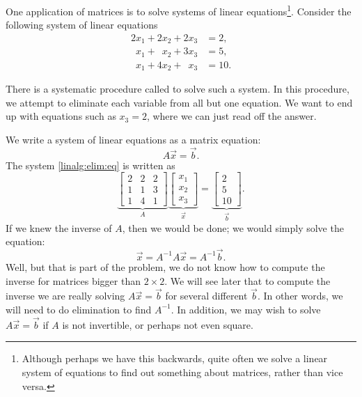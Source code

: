 One application of matrices is to solve systems of
linear equations\footnote{Although perhaps we have this backwards,
quite often we solve a linear system of equations
to find out something about matrices, rather than vice versa.}.
Consider the following system of linear equations
\begin{equation} \label{linalg:elim:eq}
\begin{aligned}
          2 x_1 +           2 x_2 +           2 x_3 & = 2 , \\
\phantom{9} x_1 + \phantom{9} x_2 +           3 x_3 & = 5 , \\
\phantom{9} x_1 +           4 x_2 + \phantom{9} x_3 & = 10 .
\end{aligned}
\end{equation}

There is a systematic procedure
called \emph{} to solve such a system.
In this procedure,
we attempt to eliminate each variable from all but one equation.
We want to end up with equations
such as $x_3 = 2$, where we can just read off the answer.

We write a system of linear equations as a matrix equation:
\begin{equation*}
A \vec{x} = \vec{b} .
\end{equation*}
The system \eqref{linalg:elim:eq} is written as
\begin{equation*}
\underbrace{
\begin{bmatrix}
2 & 2 & 2 \\
1 & 1 & 3 \\
1 & 4 & 1 
\end{bmatrix}
}_{A}
\underbrace{
\begin{bmatrix}
x_1 \\
x_2 \\
x_3
\end{bmatrix} 
}_{\vec{x}}
=
\underbrace{
\begin{bmatrix}
2 \\
5 \\
10
\end{bmatrix}
}_{\vec{b}} .
\end{equation*}
If we knew the inverse of $A$, then we would be done; we would simply solve
the equation:
\begin{equation*}
\vec{x} = A^{-1} A \vec{x} = A^{-1} \vec{b} .
\end{equation*}
Well, but that is part of the problem, we do not know how to compute the
inverse for matrices bigger than $2 \times 2$.
We will see later that to compute the inverse we are really solving
$A \vec{x} = \vec{b}$ for several different $\vec{b}$.  In other words, 
we will need to do elimination to find $A^{-1}$.
In addition, we may wish to solve $A \vec{x} = \vec{b}$
if $A$ is not invertible, or perhaps not even square.

